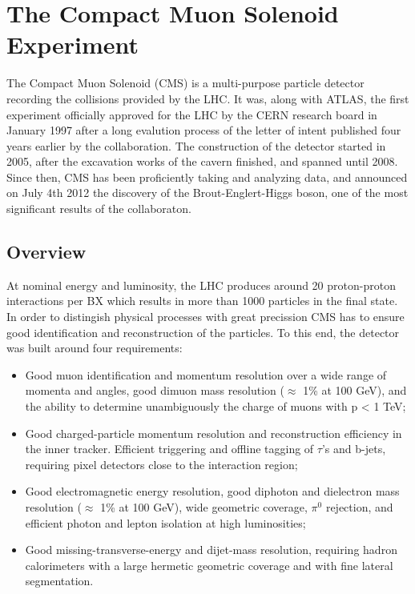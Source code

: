 \chapter{The Compact Muon Solenoid Experiment}
\label{chap:I-3-cms}

	The Compact Muon Solenoid (CMS) \cite{1748-0221-3-08-S08004} is a multi-purpose particle detector recording the collisions provided by the LHC. It was, along with ATLAS, the first experiment officially approved for the LHC by the CERN research board in January 1997 after a long evalution process of the letter of intent published four years earlier by the collaboration. The construction of the detector started in 2005, after the excavation works of the cavern finished, and spanned until 2008. Since then, CMS has been proficiently taking and analyzing data, and announced on July 4th 2012 the discovery of the Brout-Englert-Higgs boson, one of the most significant results of the collaboraton.

  \section{Overview}

    At nominal energy and luminosity, the LHC produces around 20 proton-proton interactions per BX which results in more than 1000 particles in the final state. In order to distingish physical processes with great precission CMS has to ensure good identification and reconstruction of the particles. To this end, the detector was built around four requirements:
    \begin{itemize}
      \item Good muon identification and momentum resolution over a wide range of momenta and angles, good dimuon mass resolution ($ \approx $ 1\% at 100 GeV), and the ability to determine unambiguously the charge of muons with p < 1 TeV;
      \item Good charged-particle momentum resolution and reconstruction efficiency in the inner tracker. Efficient triggering and offline tagging of $ \tau $'s and b-jets, requiring pixel detectors close to the interaction region;
      \item Good electromagnetic energy resolution, good diphoton and dielectron mass resolution ($ \approx $ 1\% at 100 GeV), wide geometric coverage, $ \pi^0 $ rejection, and efficient photon and lepton isolation at high luminosities;
      \item Good missing-transverse-energy and dijet-mass resolution, requiring hadron calorimeters with a large hermetic geometric coverage and with fine lateral segmentation. \\
    \end{itemize}

